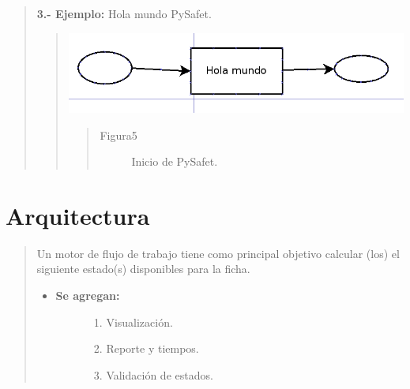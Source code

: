 \documentclass[letterpaper,11pt,spanish]{sphinxmanual}
\begin{document}
\begin{quote}
\begin{quote}
\begin{quote}
\begin{description}
\end{description}\end{quote}
\end{quote}

\textbf{3.- Ejemplo:} Hola mundo PySafet.
\begin{quote}

\includegraphics{mundo.png}
\begin{quote}\begin{description}
\item[{Figura5}] \leavevmode
Inicio de PySafet.

\end{description}\end{quote}
\end{quote}
\end{quote}


\chapter{Arquitectura}
\label{_templates/Contenido1/Introduccion:arquitectura}\begin{quote}

Un motor de flujo de trabajo tiene como principal objetivo calcular (los) el siguiente estado(s) disponibles para la ficha.
\begin{itemize}
\item {} \begin{description}
\item[{\textbf{Se agregan:}}] \leavevmode\begin{enumerate}
\item {} 
Visualización.

\item {} 
Reporte y tiempos.

\item {} 
Validación de estados.

\end{enumerate}

\end{description}

\end{itemize}
\end{quote}
\end{document}
